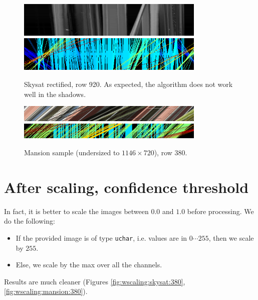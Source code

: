 \documentclass{article}
\def\epiWidth{0.8}
\theoremstyle{definition}
\begin{document}
\begin{figure}[ht]
  \centering
  \includegraphics[width=\epiWidth\textwidth]{images/1520205074004_epi.png}\\
  \includegraphics[width=\epiWidth\textwidth]{images/1520205074004_epi_colored.png}
  \caption{Skysat rectified, row 920. As expected, the algorithm does not work well in the shadows.}
\end{figure}


\begin{figure}[ht]
  \centering
  \includegraphics[width=\epiWidth\textwidth]{images/1520202945623_epi.png}\\
  \includegraphics[width=\epiWidth\textwidth]{images/1520202945623_epi_colored.png}
  \caption{Mansion sample (undersized to $1146\times 720$), row 380.}
\end{figure}


\section{After scaling, confidence threshold}


In fact, it is better to scale the images between $0.0$ and $1.0$ before processing. We do the following:
\begin{itemize}
 \item If the provided image is of type \verb#uchar#, i.e. values are in $0 \cdots 255$, then we scale by $255$.
 \item Else, we scale by the max over all the channels.
\end{itemize}
Results are much cleaner (Figures \ref{fig:wscaling:skysat:380}, \ref{fig:wscaling:mansion:380}).
\end{document}
